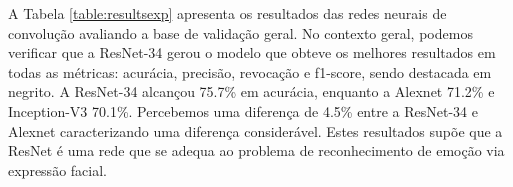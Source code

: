 A Tabela \ref{table:resultsexp} apresenta os resultados das redes neurais de convolução avaliando a base de validação geral. No contexto geral, podemos verificar que a ResNet-34 gerou o modelo que obteve os melhores resultados em todas as métricas: acurácia, precisão, revocação e f1-score, sendo destacada em negrito. A ResNet-34 alcançou 75.7\% em acurácia, enquanto a Alexnet 71.2\% e Inception-V3 70.1\%. Percebemos uma diferença de 4.5\% entre a ResNet-34 e Alexnet caracterizando uma diferença considerável. Estes resultados supõe que a ResNet é uma rede que se adequa ao problema de reconhecimento de emoção via expressão facial.


